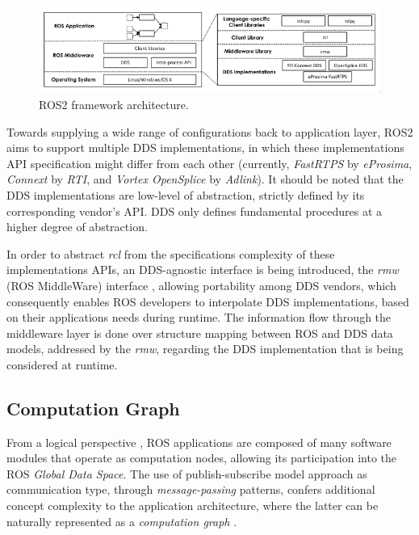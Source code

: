 \begin{figure}[H]
    \centering
    \includegraphics[width=\linewidth]{img/ros2-architecture.png}
    \caption{ROS2 framework architecture.}
    \label{fig:ros2-architecture}
\end{figure}

Towards supplying a wide range of configurations back to application layer, ROS2 aims to support multiple DDS implementations, in which these implementations API specification might differ from each other (currently, \textit{FastRTPS} by \textit{eProsima}, \textit{Connext} by \textit{RTI}, and \textit{Vortex OpenSplice} by \textit{Adlink}). It should be noted that the DDS implementations are low-level of abstraction, strictly defined by its corresponding vendor's API. DDS only defines fundamental procedures at a higher degree of abstraction.  

In order to abstract \textit{rcl} from the specifications complexity of these implementations APIs, an DDS-agnostic interface is being introduced, the \textit{rmw} (ROS MiddleWare) interface \cite{casini2019response}, allowing portability among DDS vendors, which consequently enables ROS developers to interpolate DDS implementations, based on their applications needs during runtime. The information flow through the middleware layer is done over structure mapping between ROS and DDS data models, addressed by the \textit{rmw}, regarding the DDS implementation that is being considered at runtime.

\subsection{Computation Graph}

From a logical perspective \cite{casini2019response}, ROS applications are composed of many software modules that operate as computation nodes, allowing its participation into the ROS \textit{Global Data Space}. The use of publish-subscribe model approach as communication type, through \textit{message-passing} patterns, confers additional concept complexity to the application architecture, where the latter can be naturally represented as a \textit{computation graph} \cite{cousins2010welcome}.

